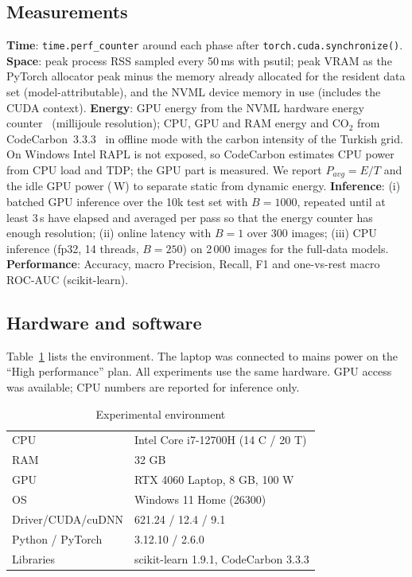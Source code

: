 \documentclass[conference]{IEEEtran}
\begin{document}
\subsection{Measurements}
\textbf{Time}: \texttt{time.perf\_counter} around each phase after \texttt{torch.cuda.synchronize()}.
\textbf{Space}: peak process RSS sampled every 50\,ms with psutil; peak VRAM as the PyTorch allocator peak minus the
memory already allocated for the resident data set (model-attributable), and the NVML device memory in use
(includes the CUDA context).
\textbf{Energy}: GPU energy from the NVML hardware energy counter~\cite{nvml} (millijoule resolution);
CPU, GPU and RAM energy and CO$_2$ from CodeCarbon~3.3.3~\cite{codecarbon} in offline mode with the carbon
intensity of the Turkish grid. On Windows Intel RAPL is not exposed, so CodeCarbon estimates CPU power from CPU load
and TDP; the GPU part is measured. We report $P_{avg}=E/T$ and the idle GPU power (\idlepower\,W) to separate static
from dynamic energy.
\textbf{Inference}: (i) batched GPU inference over the 10k test set with $B=1000$, repeated until at least 3\,s have
elapsed and averaged per pass so that the energy counter has enough resolution; (ii) online latency with $B=1$ over
300 images; (iii) CPU inference (fp32, 14 threads, $B=250$) on 2\,000 images for the full-data models.
\textbf{Performance}: Accuracy, macro Precision, Recall, F1 and one-vs-rest macro ROC-AUC (scikit-learn).

\subsection{Hardware and software}
Table~\ref{tab:hw} lists the environment. The laptop was connected to mains power on the ``High performance'' plan.
All experiments use the same hardware. GPU access was available; CPU numbers are reported for inference only.

\begin{table}[t]
\centering
\caption{Experimental environment}
\label{tab:hw}
\begin{tabular}{ll}
\toprule
CPU & Intel Core i7-12700H (14 C / 20 T)\\
RAM & 32 GB\\
GPU & RTX 4060 Laptop, 8 GB, 100 W\\
OS & Windows 11 Home (26300)\\
Driver/CUDA/cuDNN & 621.24 / 12.4 / 9.1\\
Python / PyTorch & 3.12.10 / 2.6.0\\
Libraries & scikit-learn 1.9.1, CodeCarbon 3.3.3\\
\bottomrule
\end{tabular}
\end{table}
\end{document}
